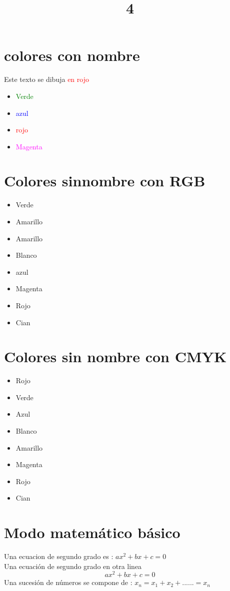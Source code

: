 \documentclass[10pt,a4paper]{article}
\title{4}
\begin{document}
	\section{colores con nombre}
		Este texto se dibuja \textcolor{red}{en rojo}
		\begin{itemize}
			\item \textcolor {green}{Verde}
			\item \textcolor {blue}{azul}
			\item \textcolor {red}{rojo}
			\item \textcolor {magenta}{Magenta}
		\end{itemize}
	\section{Colores sin\bigskip  nombre con RGB}
		
		\begin{itemize}
			\item \textcolor[rgb]{0,1,0}{Verde}
			\item \textcolor[rgb]{1,1,0}{Amarillo}
			\item \textcolor[rgb]{0.7 ,0.9, 0.3}{Amarillo}
			\item \textcolor[rgb]{1,1,1}{Blanco}
			\item \textcolor[rgb]{0,0,1}{azul}
			\item \textcolor[rgb]{1,0,1}{Magenta}
			\item \textcolor[rgb]{1,0,0}{Rojo}
			\item \textcolor[rgb]{0,1,1}{Cian}
		\end{itemize}
	\section{Colores sin nombre con CMYK}
		\begin{itemize}
			\item \textcolor[cmyk]{0,1,1,0}{Rojo}
			\item \textcolor[cmyk]{1,0,1,0}{Verde}
			\item \textcolor[cmyk]{1,1,0,0}{Azul}
			\item \textcolor[cmyk]{0,0,0,0}{Blanco}
			\item \textcolor[cmyk]{0,0,1,0}{Amarillo}
			\item \textcolor[cmyk]{0,1,0,0}{Magenta}
			\item \textcolor[cmyk]{1,0,1,0}{Rojo}
			\item \textcolor[cmyk]{1,0,0,0}{Cian}
		\end{itemize}
	\section{Modo matemático básico}
		Una ecuacion de segundo grado es :
			$ax^2+bx+c=0$ \\
		Una ecuación de segundo grado en otra linea
			$$ax^2+bx+c=0$$	
		Una sucesión de números se compone de :
		$ x_n = x_1 + x_2 +...... = x_n$
\end{document}
